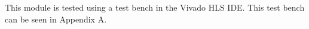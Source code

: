 This module is tested using a test bench in the Vivado HLS IDE. This test bench can be seen in Appendix A.



